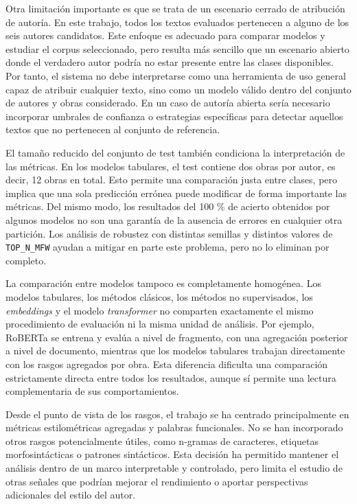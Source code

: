 \documentclass[IB]{TFUOC}%
\begin{document}
Otra limitación importante es que se trata de un escenario cerrado de atribución de autoría. En este trabajo, todos los textos evaluados pertenecen a alguno de los seis autores candidatos. Este enfoque es adecuado para comparar modelos y estudiar el corpus seleccionado, pero resulta más sencillo que un escenario abierto donde el verdadero autor podría no estar presente entre las clases disponibles. Por tanto, el sistema no debe interpretarse como una herramienta de uso general capaz de atribuir cualquier texto, sino como un modelo válido dentro del conjunto de autores y obras considerado. En un caso de autoría abierta sería necesario incorporar umbrales de confianza o estrategias específicas para detectar aquellos textos que no pertenecen al conjunto de referencia.

El tamaño reducido del conjunto de test también condiciona la interpretación de las métricas. En los modelos tabulares, el test contiene dos obras por autor, es decir, 12 obras en total. Esto permite una comparación justa entre clases, pero implica que una sola predicción errónea puede modificar de forma importante las métricas. Del mismo modo, los resultados del 100 \% de acierto obtenidos por algunos modelos no son una garantía de la ausencia de errores en cualquier otra partición. Los análisis de robustez con distintas semillas y distintos valores de \texttt{TOP\_N\_MFW} ayudan a mitigar en parte este problema, pero no lo eliminan por completo.

La comparación entre modelos tampoco es completamente homogénea. Los modelos tabulares, los métodos clásicos, los métodos no supervisados, los \textit{embeddings} y el modelo \textit{transformer} no comparten exactamente el mismo procedimiento de evaluación ni la misma unidad de análisis. Por ejemplo, RoBERTa se entrena y evalúa a nivel de fragmento, con una agregación posterior a nivel de documento, mientras que los modelos tabulares trabajan directamente con los rasgos agregados por obra. Esta diferencia dificulta una comparación estrictamente directa entre todos los resultados, aunque sí permite una lectura complementaria de sus comportamientos.

Desde el punto de vista de los rasgos, el trabajo se ha centrado principalmente en métricas estilométricas agregadas y palabras funcionales. No se han incorporado otros rasgos potencialmente útiles, como n-gramas de caracteres, etiquetas morfosintácticas o patrones sintácticos. Esta decisión ha permitido mantener el análisis dentro de un marco interpretable y controlado, pero limita el estudio de otras señales que podrían mejorar el rendimiento o aportar perspectivas adicionales del estilo del autor.
\end{document}
